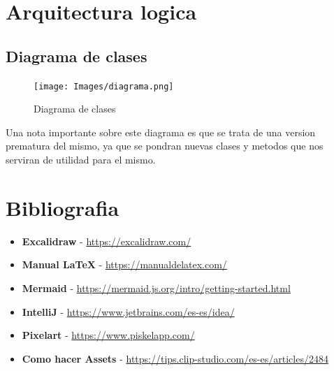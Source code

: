 \documentclass[a4paper]{article}
\begin{document}
\section{Arquitectura logica}
\subsection{Diagrama de clases}
\begin{figure}[ht]
    \centering
    \texttt{[image: Images/diagrama.png]}
    \caption{Diagrama de clases}
    \label{fig:diagrama-clases}
\end{figure}
Una nota importante sobre este diagrama es que se trata de una version prematura del mismo, ya que se pondran nuevas clases y metodos que nos serviran de utilidad para el mismo.
\clearpage
\section{Bibliografia}
\begin{itemize}
    \item \textbf{Excalidraw} - \url{https://excalidraw.com/}
    \item \textbf{Manual LaTeX} - \url{https://manualdelatex.com/}
    \item \textbf{Mermaid} - \url{https://mermaid.js.org/intro/getting-started.html}
    \item \textbf{IntelliJ} - \url{https://www.jetbrains.com/es-es/idea/}
    \item \textbf{Pixelart} - \url{https://www.piskelapp.com/}
    \item \textbf{Como hacer Assets} - \url{https://tips.clip-studio.com/es-es/articles/2484}
    
\end{itemize}
\end{document}
